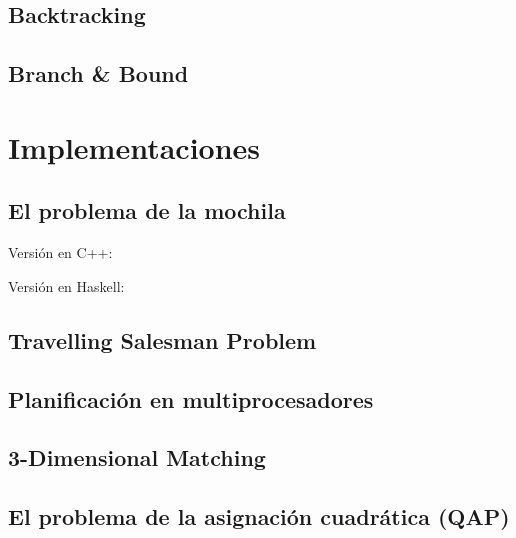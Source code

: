 \documentclass[a4paper, 11pt]{article} %
\begin{document}
  \subsection{Backtracking}
  \subsection{Branch \& Bound}


\section{Implementaciones}
  \subsection{El problema de la mochila}
        Versión en C++:
        
        \small
  	\texttt{}
        \normalsize
        
        Versión en Haskell:
        
        \small
  	\texttt{}
        \normalsize
        
  \subsection{Travelling Salesman Problem}
        \small
  	\texttt{}
        \normalsize
  \subsection{Planificación en multiprocesadores}
        \small
  	\texttt{}
        \normalsize
  \subsection{3-Dimensional Matching}
        \small
  	\texttt{}
        \normalsize
  \subsection{El problema de la asignación cuadrática (QAP)}
        \small
        \normalsize

    
\end{document}
